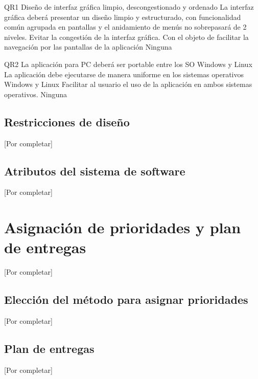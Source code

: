 \documentclass[paper=a4,oneside,fontsize=12pt]{article}
\begin{document}
		{QR1}
			{Diseño de interfaz gráfica limpio, descongestionado y ordenado}
			{La interfaz gráfica deberá presentar un diseño limpio y estructurado, con funcionalidad común agrupada en pantallas y el anidamiento de menús no sobrepasará de 2 niveles. Evitar la congestión de la interfaz gráfica.}
			{Con el objeto de facilitar la navegación por las pantallas de la aplicación}
			{Ninguna}
		
			{QR2}
				{La aplicación para PC deberá ser portable entre los SO Windows y Linux}
				{La aplicación debe ejecutarse de manera uniforme en los sistemas operativos Windows y Linux}
				{Facilitar al usuario el uso de la aplicación en ambos sistemas operativos.}
				{Ninguna}		
	
			
	\subsection{Restricciones de diseño}
	
	[Por completar]
	
	\subsection{Atributos del sistema de software}
	
	[Por completar]
	
	\section{Asignación de prioridades y plan de entregas}

	[Por completar]
	
	\subsection{Elección del método para asignar prioridades}
	
	[Por completar]
		
		
	\subsection{Plan de entregas}
	
	[Por completar]	
	
\end{document}
